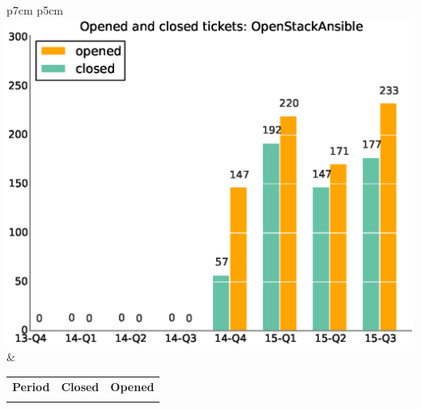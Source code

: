 \documentclass[a4wide,11pt]{article}
\begin{document}
\begin{tabular}{p{7cm} p{5cm}}
    \vspace{0pt} 
    \includegraphics[scale=.35]{figs/closedOpenStackAnsible.eps}
    & 
    \vspace{0pt}
    \begin{tabular}{l|r|r|}%
    \bfseries Period & \bfseries Closed & \bfseries Opened
    \csvreader[head to column names]{data/closedOpenStackAnsible.csv}{}%
    {\\ & \closed & \opened}
    \end{tabular}
\end{tabular}
\end{document}
